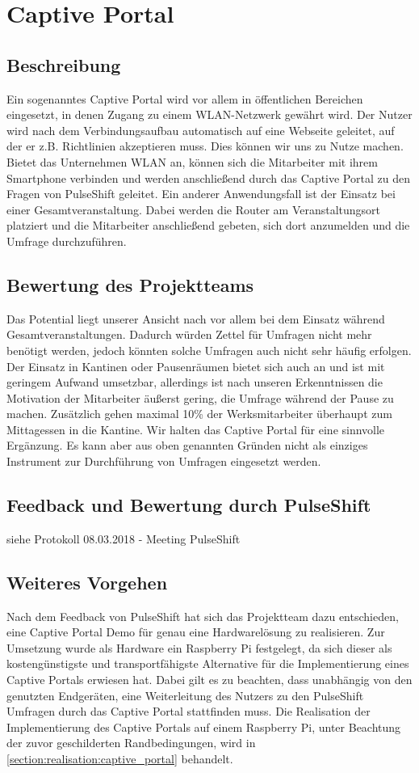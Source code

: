 \section{Captive Portal}


\subsection{Beschreibung}
Ein sogenanntes Captive Portal wird vor allem in öffentlichen Bereichen eingesetzt, in denen Zugang zu einem WLAN-Netzwerk gewährt wird. Der Nutzer wird nach dem Verbindungsaufbau automatisch auf eine Webseite geleitet, auf der er z.B. Richtlinien akzeptieren muss. Dies können wir uns zu Nutze machen. Bietet das Unternehmen WLAN an, können sich die Mitarbeiter mit ihrem Smartphone verbinden und werden anschließend durch das Captive Portal zu den Fragen von PulseShift geleitet. Ein anderer Anwendungsfall ist der Einsatz bei einer Gesamtveranstaltung. Dabei werden die Router am Veranstaltungsort platziert und die Mitarbeiter anschließend gebeten, sich dort anzumelden und die Umfrage durchzuführen.

\subsection{Bewertung des Projektteams}
Das Potential liegt unserer Ansicht nach vor allem bei dem Einsatz während Gesamtveranstaltungen. Dadurch würden Zettel für Umfragen nicht mehr benötigt werden, jedoch könnten solche Umfragen auch nicht sehr häufig erfolgen. Der Einsatz in Kantinen oder Pausenräumen bietet sich auch an und ist mit geringem Aufwand umsetzbar, allerdings ist nach unseren Erkenntnissen die Motivation der Mitarbeiter äußerst gering, die Umfrage während der Pause zu machen. Zusätzlich gehen maximal 10\% der Werksmitarbeiter überhaupt zum Mittagessen in die Kantine.
Wir halten das Captive Portal für eine sinnvolle Ergänzung. Es kann aber aus oben genannten Gründen nicht als einziges Instrument zur Durchführung von Umfragen eingesetzt werden.

\subsection{Feedback und Bewertung durch PulseShift}

siehe Protokoll 08.03.2018 - Meeting PulseShift

\subsection{Weiteres Vorgehen}
Nach dem Feedback von PulseShift hat sich das Projektteam dazu entschieden, eine Captive Portal Demo für genau eine Hardwarelösung zu realisieren. Zur Umsetzung wurde als Hardware ein Raspberry Pi festgelegt, da sich dieser als kostengünstigste und transportfähigste Alternative für die Implementierung eines Captive Portals erwiesen hat. Dabei gilt es zu beachten, dass unabhängig von den genutzten Endgeräten, eine Weiterleitung des Nutzers zu den PulseShift Umfragen durch das Captive Portal stattfinden muss. Die Realisation der Implementierung des Captive Portals auf einem Raspberry Pi, unter Beachtung der zuvor geschilderten Randbedingungen, wird in \vref{section:realisation:captive_portal} behandelt.

